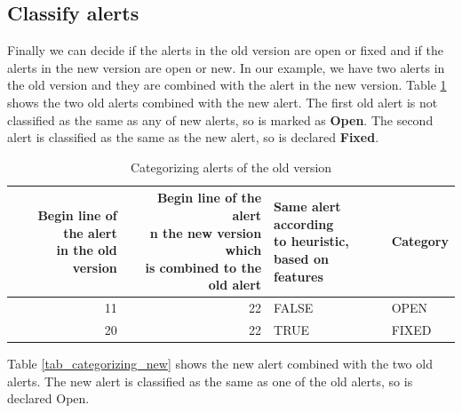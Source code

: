 \documentclass[
]{article}
\begin{document}
\normalsize

\subsection{Classify alerts}\label{heuristic}

Finally we can decide if the alerts in the old version are open or fixed
and if the alerts in the new version are open or new. In our example, we
have two alerts in the old version and they are combined with the alert
in the new version. Table \ref{tab_categorizing_old} shows the two old
alerts combined with the new alert. The first old alert is not
classified as the same as any of new alerts, so is marked as
\textbf{Open}. The second alert is classified as the same as the new
alert, so is declared \textbf{Fixed}.

\small

\begin{table}[H]

\caption{\label{tab:unnamed-chunk-15}Categorizing alerts of the old version \label{tab_categorizing_old} }
\centering
\begin{tabular}[t]{r|r|l|l}
\hline
\makecell[l]{Begin line of the alert\\in the old version} & \makecell[l]{Begin line of the alert\\n the new version which\\is combined to the old alert} & \makecell[l]{Same alert according\\to heuristic,\\ based on features} & Category\\
\hline
\rowcolor{gray!6}  11 & 22 & FALSE & OPEN\\
\cline{1-4}
20 & 22 & TRUE & FIXED\\
\hline
\end{tabular}
\end{table}

\normalsize

Table \ref{tab_categorizing_new} shows the new alert combined with the
two old alerts. The new alert is classified as the same as one of the
old alerts, so is declared Open.

\small
\end{document}
